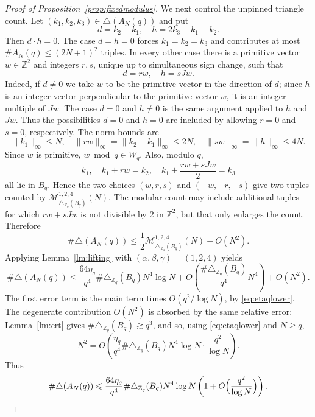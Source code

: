 \documentclass[11pt,reqno]{amsart}
\numberwithin{equation}{section}
\newcommand{\norm}[1]{\lVert #1\rVert_\infty}
\renewcommand{\le}{\leqslant}
\renewcommand{\ge}{\geqslant}
\begin{document}
\begin{proof}[Proof of Proposition~\ref{prop:fixedmodulus}]
We next control the unpinned triangle count. Let
$(k_1,k_2,k_3)\in\triangle(A_N(q))$ and put
\[ d=k_2-k_1, \quad h=2k_3-k_1-k_2. \]
Then $d\cdot h=0$. The case $d=h=0$ forces $k_1=k_2=k_3$ and contributes at most $\#A_N(q)\le (2N+1)^2$ triples. In every other case there is a primitive vector $w\in\mathbb{Z}^2$ and integers $r,s$, unique up to simultaneous sign change, such that
\[ d=rw, \quad h=sJw. \]
Indeed, if $d\ne0$ we take $w$ to be the primitive vector in the direction of $d$; since $h$ is an integer vector perpendicular to the primitive vector $w$, it is an integer multiple of $Jw$. The case $d=0$ and $h\ne0$ is the same argument applied to $h$ and $Jw$. Thus the possibilities $d=0$ and $h=0$ are included by allowing $r=0$ and $s=0$, respectively. The norm bounds are
\[ \norm{k_1}\le N, \quad \norm{rw}=\norm{k_2-k_1}\le2N, \quad \norm{sw}=\norm{h}\le4N. \]
Since $w$ is primitive, $w\bmod q\in W_q$. Also, modulo $q$,
\[ k_1, \quad k_1+rw=k_2, \quad k_1+\frac{rw+sJw}{2}=k_3 \]
all lie in $B_q$. Hence the two choices $(w,r,s)$ and $(-w,-r,-s)$ give two tuples counted by
$\mathcal{M}_{\triangle_{\mathbb{Z}_q}(B_q)}^{1,2,4}(N)$. The modular count may include additional tuples for which $rw+sJw$ is not divisible by $2$ in $\mathbb{Z}^2$, but that only enlarges the count. Therefore
\[ \#\triangle(A_N(q)) \le \frac12\mathcal{M}_{\triangle_{\mathbb{Z}_q}(B_q)}^{1,2,4}(N)+O(N^2). \]
Applying Lemma~\ref{lm:lifting} with $(\alpha,\beta,\gamma)=(1,2,4)$ yields
\[ \#\triangle(A_N(q)) \le \frac{64\eta_q}{q^4}\#\triangle_{\mathbb{Z}_q}(B_q)N^4\log N + O\left(\frac{\#\triangle_{\mathbb{Z}_q}(B_q)}{q^4}N^4\right) + O(N^2). \]
The first error term is the main term times $O(q^2/\log N)$, by \eqref{eq:etaqlower}. The degenerate contribution $O(N^2)$ is absorbed by the same relative error: Lemma~\ref{lm:crt} gives $\#\triangle_{\mathbb{Z}_q}(B_q)\gtrsim q^3$, and so, using \eqref{eq:etaqlower} and $N\ge q$,
\[ N^2=O\left(\frac{\eta_q}{q^4}\#\triangle_{\mathbb{Z}_q}(B_q)N^4\log N\cdot\frac{q^2}{\log N}\right). \]
Thus
\begin{equation}\label{eq:triasymp}
\#\triangle(A_N(q)) \le \frac{64\eta_q}{q^4}\#\triangle_{\mathbb{Z}_q}(B_q)N^4\log N \left(1+O\Bigl(\frac{q^2}{\log N}\Bigr)\right).
\end{equation}


\end{proof}
\end{document}
